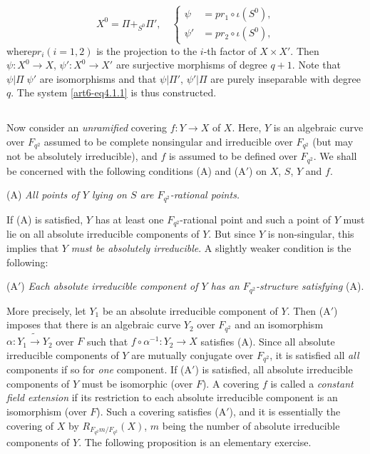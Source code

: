 \begin{equation}
X^0 = \Pi  {\displaystyle{\mathop{+}_{S^0}}} \Pi', \quad 
\begin{cases}
\psi & = pr_1 \circ \iota (S^0),\\
\psi' & = pr_2 \circ \iota (S^0),
\end{cases}
\label{art6-eq4.1.5}
\end{equation}
where\pageoriginale $pr_i(i = 1, 2)$ is the projection to the $i$-th factor of $X \times X'$. Then $\psi: X^0 \to X$, $\psi' : X^0 \to X'$ are surjective morphisms of degree $q+1$. Note that $\psi | \Pi \; \psi' $ are isomorphisms and that $\psi |\Pi'$, $\psi' |\Pi$ are purely inseparable with degree $q$. The system \eqref{art6-eq4.1.1} is thus constructed.

\subsection{}\label{art6-subsec4.2}
Now consider an \textit{unramified} covering $f : Y \to X$ of $X$. Here, $Y$ is an algebraic curve over $F_{q^2}$ assumed to be complete nonsingular and irreducible over $F_{q^2}$ (but may not be absolutely irreducible), and $f$ is assumed to be defined over $F_{q^2}$. We shall be concerned with the following conditions (A) and (A$'$) on $X$, $S$, $Y$ and $f$.

(A) \textit{All points of $Y$ lying on $S$ are $F_{q^2}$-rational points.}

If (A) is satisfied, $Y$ has at least one $F_{q^2}$-rational point and such a point of $Y$ must lie on all absolute irreducible components of $Y$. But since $Y$ is non-singular, this implies that $Y$ \textit{must be absolutely irreducible}. A slightly weaker condition is the following:

(A$'$) \textit{Each absolute irreducible component of $Y$ has an $F_{q^2}$-structure satisfying} (A).

More precisely, let $Y_1$ be an absolute irreducible component of $Y$. Then (A$'$) imposes that there is an algebraic curve $Y_2$ over $F_{q^2}$ and an isomorphism $\alpha : Y_1 \tilde{\longrightarrow} Y_2$ over $F$ such that $f \circ \alpha^{-1} : Y_2 \to X$  satisfies (A). Since all absolute irreducible components of $Y$ are mutually conjugate over $F_{q^2}$, it is satisfied all \textit{all} components if so for \textit{one} component. If (A$'$) is satisfied, all absolute irreducible components of $Y$ must be isomorphic (over $F$). A covering $f$ is called a \textit{constant field extension} if its restriction to each absolute irreducible component is an isomorphism (over $F$). Such a covering satisfies (A$'$), and it is essentially the covering of $X$ by $R_{F_{q^2}m/ F_{q^2}} (X)$, $m$ being the number of absolute irreducible components of $Y$. The following proposition is an elementary exercise.

